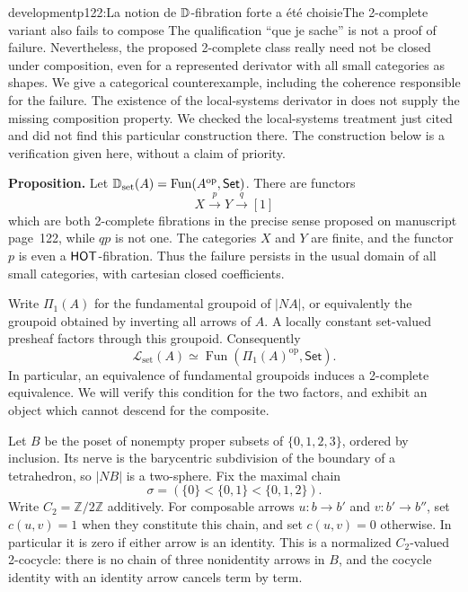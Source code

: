 \begin{dcomment}{development}{p122:La notion de $\mathbb{D}$-fibration forte a été choisie}{The 2-complete variant also fails to compose}
The qualification ``que je sache'' is not a proof of failure. Nevertheless, the proposed 2-complete class really need not be closed under composition, even for a represented derivator with all small categories as shapes. We give a categorical counterexample, including the coherence responsible for the failure. The existence of the local-systems derivator in \citet[Theorem~3.13]{Cisinski2009LocallyConstant} does not supply the missing composition property. We checked the local-systems treatment just cited and did not find this particular construction there. The construction below is a verification given here, without a claim of priority.

\textbf{Proposition.}\ours\quad
Let $\mathbb{D}_{\mathrm{set}}(A)=\operatorname{Fun}(A^{\mathrm{op}},\mathsf{Set})$. There are functors
\[
 X\xrightarrow{p}Y\xrightarrow{q}[1]
\]
which are both 2-complete fibrations in the precise sense proposed on manuscript page~122, while $qp$ is not one. The categories $X$ and $Y$ are finite, and the functor $p$ is even a $\mathsf{HOT}$-fibration. Thus the failure persists in the usual domain of all small categories, with cartesian closed coefficients.

Write $\Pi_1(A)$ for the fundamental groupoid of $|NA|$, or equivalently the groupoid obtained by inverting all arrows of $A$. A locally constant set-valued presheaf factors through this groupoid. Consequently
\[
 \mathcal L_{\mathrm{set}}(A)
 \simeq\operatorname{Fun}(\Pi_1(A)^{\mathrm{op}},\mathsf{Set}).
\]
In particular, an equivalence of fundamental groupoids induces a 2-complete equivalence. We will verify this condition for the two factors, and exhibit an object which cannot descend for the composite.

Let $B$ be the poset of nonempty proper subsets of $\{0,1,2,3\}$, ordered by inclusion. Its nerve is the barycentric subdivision of the boundary of a tetrahedron, so $|NB|$ is a two-sphere. Fix the maximal chain
\[
 \sigma=(\{0\}<\{0,1\}<\{0,1,2\}).
\]
Write $C_2=\mathbb Z/2\mathbb Z$ additively. For composable arrows $u:b\to b'$ and $v:b'\to b''$, set $c(u,v)=1$ when they constitute this chain, and set $c(u,v)=0$ otherwise. In particular it is zero if either arrow is an identity. This is a normalized $C_2$-valued 2-cocycle: there is no chain of three nonidentity arrows in $B$, and the cocycle identity with an identity arrow cancels term by term.


\end{dcomment}
